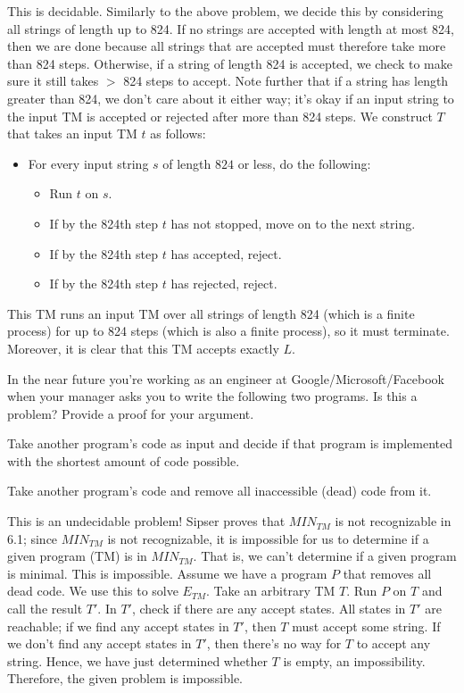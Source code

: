 \documentclass[solution, letterpaper]{cs121}
\begin{document}
\begin{solution}
\subsolution This is decidable. Similarly to the above problem, we decide this by considering all strings of length up to 824.  If no strings are accepted with length at most 824, then we are done because all strings that are accepted must therefore take more than 824 steps.  Otherwise, if a string of length 824 is accepted, we check to make sure it still takes $>$ 824 steps to accept.  Note further that if a string has length greater than 824, we don't care about it either way; it's okay if an input string to the input TM is accepted or rejected after more than 824 steps.  We construct $T$ that takes an input TM $t$ as follows:
\begin{itemize}
	\setlength\itemsep{0cm}
	\item For every input string $s$ of length $824$ or less, do the following:
	\begin{itemize}
		\item Run $t$ on $s$.
		\item If by the 824th step $t$ has not stopped, move on to the next string.
		\item If by the 824th step $t$ has accepted, reject.
		\item If by the 824th step $t$ has rejected, reject.
	\end{itemize}
\end{itemize}

This TM runs an input TM over all strings of length 824 (which is a finite process) for up to 824 steps (which is also a finite process), so it must terminate.  Moreover, it is clear that this TM accepts exactly $L$.
\end{solution}

In the near future you're working as an engineer at Google/Microsoft/Facebook when your manager asks you to write the following two programs. Is this a problem? Provide a proof for your argument.

\subproblem Take another program's code as input and decide if that program is implemented with the shortest amount of code possible.

\subproblem Take another program's code and remove all inaccessible (dead) code from it.

\begin{solution}
\subsolution This is an undecidable problem!  Sipser proves that $MIN_{TM}$ is not recognizable in 6.1; since $MIN_{TM}$ is not recognizable, it is impossible for us to determine if a given program (TM) is in $MIN_{TM}$.  That is, we can't determine if a given program is minimal.
\subsolution This is impossible.  Assume we have a program $P$ that removes all dead code.  We use this to solve $E_{TM}$.  Take an arbitrary TM $T$.  Run $P$ on $T$ and call the result $T'$.  In $T'$, check if there are any accept states.  All states in $T'$ are reachable; if we find any accept states in $T'$, then $T$ must accept some string.  If we don't find any accept states in $T'$, then there's no way for $T$ to accept any string.  Hence, we have just determined whether $T$ is empty, an impossibility.  Therefore, the given problem is impossible.
\end{solution}
\end{document}
